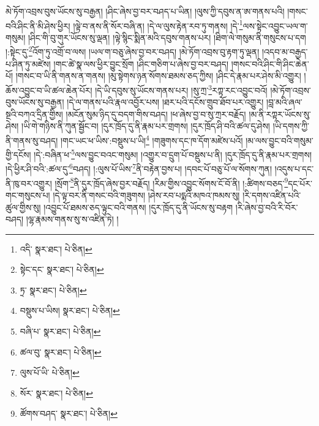 མེ་ཏོག་འབྲས་བུས་ཡོངས་སུ་བརྒྱན། །ཤིང་ཞེས་བྱ་བར་བཤད་པ་ཡིན། །ལུས་ཀྱི་དབུས་ན་ཨ་གནས་པའི། །གསང་བའི་ཤིང་ནི་མི་ཤེས་ཕྱིར། །ལྟེ་བ་ནས་ནི་སོར་བཞི་ན། །དེ་ལ་ལུས་རྟེན་རབ་ཏུ་གནས། །དེ་\footnote{འདི་  སྣར་ཐང་།  པེ་ཅིན། }ལས་སྟེང་འབྱུང་ཡལ་ག་གསུམ། །ཤིང་གི་བུ་གུར་ཡོངས་སུ་ལྡན། །ལྟེ་སྙིང་སྨིན་མའི་དབུས་གནས་པར། །ཐིག་ལེ་གསུམ་ནི་གསུངས་པ་དག །:སྟེང་དུ་\footnote{སྟེང་དང་  སྣར་ཐང་།  པེ་ཅིན། }འོག་ཏུ་འགྲོ་བ་ལས། །ཡལ་ག་བཅུ་ཞེས་བྱ་བར་བཤད། །མེ་ཏོག་འབྲས་བུ་རྟག་ཏུ་ལྡན། །འདབ་མ་བརྒྱད་པ་ཤིན་ཏུ་མཛེས། །གང་ཚེ་སྣ་ལས་ཕྱིར་བྱུང་སྲོག །ཤིང་གཅིག་པ་ཞེས་བྱ་བར་བཤད། །གསང་བའི་ཤིང་གི་ཤིང་ཆེན་པོ། །གསང་བ་ཡི་ནི་གནས་ན་གནས། །མུ་སྟེགས་ཉན་སོགས་ཐམས་ཅད་ཀྱིས། །ཤིང་དེ་རྣམ་པར་ཤེས་མི་འགྱུར། །ཆོས་འབྱུང་བ་ཡི་ཚལ་ཆེན་པོར། །དེ་ཡི་དབུས་སུ་ཡོངས་གནས་པར། །སུ་ཀྲ་\footnote{ཏྲ་  སྣར་ཐང་།  པེ་ཅིན། }རཀྟ་རང་འབྱུང་བའོ། །མེ་ཏོག་འབྲས་བུས་ཡོངས་སུ་བརྒྱན། །དེ་ལ་གནས་པའི་རྣལ་འབྱོར་པས། །ཐར་པའི་དངོས་གྲུབ་ཐོབ་པར་འགྱུར། །བླ་མའི་ཞལ་སྔའི་བཀའ་དྲིན་གྱིས། །མངོན་སུམ་ཉིད་དུ་བདག་གིས་བཤད། །ཕ་ཞེས་བྱ་བ་སུ་ཀྲར་བརྗོད། །མ་ནི་རཀྟར་ཡོངས་སུ་ཤེས། །ཡི་གེ་གཉིས་ནི་ཀུན་སྦྱོང་བ། །དུར་ཁྲོད་དུ་ནི་རྣམ་པར་གྲགས། །དུར་ཁྲོད་ཤི་བའི་ཚལ་དུ་ཤེས། །ཡི་དགས་ཀྱི་ནི་གནས་སུ་བཤད། །གང་ཡང་ཕ་ཡིས་:བསྡུས་པ་ཡི།\footnote{བསྡུས་པ་ཡིས།  སྣར་ཐང་།  པེ་ཅིན། } །གཟུགས་དང་ཁ་དོག་མཛེས་པའོ། །མ་ལས་བྱུང་བའི་གསུམ་གྱི་དངོས། །དེ་:བཞིན་ཕ་\footnote{བཞི་པ་  སྣར་ཐང་།  པེ་ཅིན། }ལས་བྱུང་བའང་གསུམ། །འགྱུར་བ་དྲུག་པོ་བསྡུས་པ་ནི། །དུར་ཁྲོད་དུ་ནི་རྣམ་པར་གྲགས། །དེ་ཕྱིར་ཤི་བའི་:ཚལ་དུ་\footnote{ཚལ་བུ་  སྣར་ཐང་།  པེ་ཅིན། }བཤད། །:ལུས་པོ་ཡིས་\footnote{ལུས་པོ་ཡི་  པེ་ཅིན། }ནི་བརྟེན་བྱས་པ། །དབང་པོ་བཅུ་པོ་ལ་སོགས་ཀུན། །འདུས་པ་དང་ནི་ཁུ་བར་འགྱུར། །སྲོག་\footnote{སོར་  སྣར་ཐང་།  པེ་ཅིན། }ནི་དུར་ཁྲོད་ཞེས་བྱར་བརྗོད། །རིམ་གྱིས་འབྱུང་སོགས་ངོ་བོ་ནི། །:ཚིགས་བཅད་\footnote{ཚོགས་བཤད་  སྣར་ཐང་།  པེ་ཅིན། }དང་པོར་གང་གསུངས་པ། །དེ་ལྟ་བར་ནི་གསང་བའི་གཟུགས། །ཤེས་རབ་པདྨའི་མཁའ་ཁམས་སུ། །རི་དགས་འཛིན་པའི་ཚུལ་གྱིས་སུ། །འབྱུང་པོ་ཐམས་ཅད་ལྟུང་བའི་གནས། །དུར་ཁྲོད་དུ་ནི་ཡོངས་སུ་བརྟག །རི་ཞེས་བྱ་བའི་རི་བོར་བཤད། །ལྷ་རྣམས་གནས་སུ་ས་འཛིན་ཏེ། །
